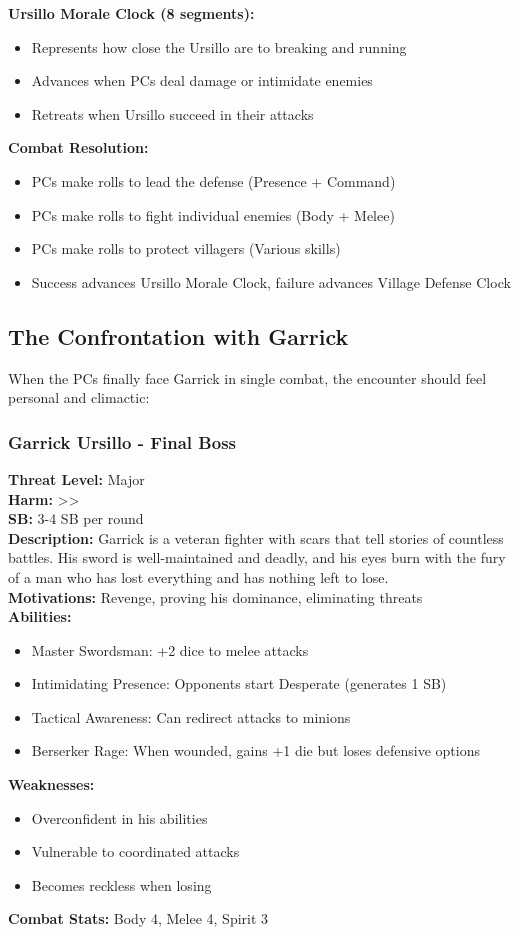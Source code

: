\documentclass[11pt]{article}
\newenvironment{encounterbox}[1]{%
  \begin{mdframed}[backgroundcolor=encountercolor!30, linewidth=1pt, linecolor=accentcolor]%
  \subsubsection*{#1}%
}{%
  \end{mdframed}%
}
\begin{document}
\textbf{Ursillo Morale Clock (8 segments):}
\begin{itemize}
\item Represents how close the Ursillo are to breaking and running
\item Advances when PCs deal damage or intimidate enemies
\item Retreats when Ursillo succeed in their attacks
\end{itemize}

\textbf{Combat Resolution:}
\begin{itemize}
\item PCs make rolls to lead the defense (Presence + Command)
\item PCs make rolls to fight individual enemies (Body + Melee)
\item PCs make rolls to protect villagers (Various skills)
\item Success advances Ursillo Morale Clock, failure advances Village Defense Clock
\end{itemize}

\subsection{The Confrontation with Garrick}

When the PCs finally face Garrick in single combat, the encounter should feel personal and climactic:

\begin{encounterbox}{Garrick Ursillo - Final Boss}
\textbf{Threat Level:} Major \\
\textbf{Harm:} \textgreater\textgreater \\
\textbf{SB:} 3-4 SB per round \\
\textbf{Description:} Garrick is a veteran fighter with scars that tell stories of countless battles. His sword is well-maintained and deadly, and his eyes burn with the fury of a man who has lost everything and has nothing left to lose. \\
\textbf{Motivations:} Revenge, proving his dominance, eliminating threats \\
\textbf{Abilities:}
\begin{itemize}
    \item Master Swordsman: +2 dice to melee attacks
    \item Intimidating Presence: Opponents start Desperate (generates 1 SB)
    \item Tactical Awareness: Can redirect attacks to minions
    \item Berserker Rage: When wounded, gains +1 die but loses defensive options
\end{itemize}
\textbf{Weaknesses:}
\begin{itemize}
    \item Overconfident in his abilities
    \item Vulnerable to coordinated attacks
    \item Becomes reckless when losing
\end{itemize}
\textbf{Combat Stats:} Body 4, Melee 4, Spirit 3
\end{encounterbox}
\end{document}
